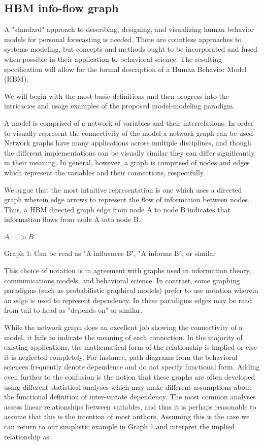\documentclass[conference]{IEEEtran}
\begin{document}
\subsection{HBM info-flow graph}
A "standard" approach to describing, designing, and visualizing human behavior models for personal forecasting is needed.
There are countless approaches to systems modeling, but concepts and methods ought to be incorporated and fused when possible in their application to behavioral science.
The resulting specification will allow for the formal description of a Human Behavior Model (HBM).

We will begin with the most basic definitions and then progress into the intricacies and usage examples of the proposed model-modeling paradigm.

A model is comprised of a network of variables and their interrelations.
In order to visually represent the connectivity of the model a network graph can be used.
Network graphs have many applications across multiple disciplines, and though the different implementations can be visually similar they can differ significantly in their meaning.
In general, however, a graph is comprised of nodes and edges which represent the variables and their connections, respectfully. 

We argue that the most intuitive representation is one which uses a directed graph wherein edge arrows to represent the flow of information between nodes.
Thus, a HBM  directed graph edge from node A to node B indicates that information flows from node A into node B. 

$A => B$

Graph 1: Can be read as "A influences B", "A informs B", or similar

This choice of notation is in agreement with graphs used in information theory, communications models, and behavioral science.
In contrast, some graphing paradigms (such as probabilistic graphical models) prefer to use notation wherein an edge is used to represent dependency.
In these paradigms edges may be read from tail to head as "depends on" or similar.

While the network graph does an excellent job showing the connectivity of a model, it fails to indicate the meaning of each connection.
In the majority of existing applications, the mathematical form of the relationship is implied or else it is neglected completely.
For instance, path diagrams from the behavioral sciences frequently denote dependence and do not specify functional form.
Adding even further to the confusion is the notion that these graphs are often developed using different statistical analyses which may make different assumptions about the functional definition of inter-variate dependency.
The most common analyses assess linear relationships between variables, and thus it is perhaps reasonable to assume that this is the intention of most authors.
Assuming this is the case we can return to our simplistic example in Graph 1 and interpret the implied relationship as:
\end{document}
